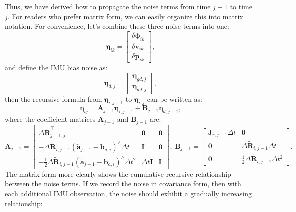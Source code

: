 Thus, we have derived how to propagate the noise terms from time $j-1$ to time $j$. For readers who prefer matrix form, we can easily organize this into matrix notation. For convenience, let's combine these three noise terms into one:
\begin{equation}\label{key}
	\boldsymbol{\eta}_{ik} = \begin{bmatrix}
		\delta \boldsymbol{\phi}_{ik} \\
		\delta \bm{v}_{ik} \\
		\delta \bm{p}_{ik}
	\end{bmatrix} ,
\end{equation}
and define the IMU bias noise as:
\begin{equation}\label{key}
	\boldsymbol{\eta}_{d,j} =\begin{bmatrix}
		\boldsymbol{\eta}_{gd, j} \\
		\boldsymbol{\eta}_{ad, j}
	\end{bmatrix},
\end{equation}
then the recursive formula from $\boldsymbol{\eta}_{i,j-1}$ to $\boldsymbol{\eta}_{i,j}$ can be written as:
\begin{equation}\label{key}
	\boldsymbol{\eta}_{ij} = \bm{A}_{j-1} \boldsymbol{\eta}_{i,j-1} + \bm{B}_{j-1} \boldsymbol{\eta}_{d,j-1},
\end{equation}
where the coefficient matrices $\bm{A}_{j-1}$ and $\bm{B}_{j-1}$ are:
\begin{equation}\label{eq:preinteg-update-cov}
	\bm{A}_{j-1} = \begin{bmatrix}
		\Delta \tilde{\bm{R}}_{j-1, j}^\top & \bm{0} & \bm{0} \\
		-\Delta \tilde{\bm{R}}_{i, j-1} (\tilde{\bm{a}}_{j-1} - \bm{b}_{a,i})^\wedge \Delta t & \bm{I} & \bm{0} \\
		- \frac{1}{2} \Delta \tilde{\bm{R}}_{i, j-1}  (\tilde{\bm{a}}_{j-1} - \bm{b}_{a,i})^\wedge \Delta t^2 & 
		\Delta t \bm{I} & \bm{I} 
	\end{bmatrix}, \ 
	\bm{B}_{j-1} = \begin{bmatrix}
		\bm{J}_{r,j-1} \Delta t & \bm{0} \\
		\bm{0} & \Delta \tilde{\bm{R}}_{i, j-1} \Delta t \\
		\bm{0} & \frac{1}{2} \Delta \tilde{\bm{R}}_{i,j-1} \Delta t^2 
	\end{bmatrix}.
\end{equation}
The matrix form more clearly shows the cumulative recursive relationship between the noise terms. If we record the noise in covariance form, then with each additional IMU observation, the noise should exhibit a gradually increasing relationship:

